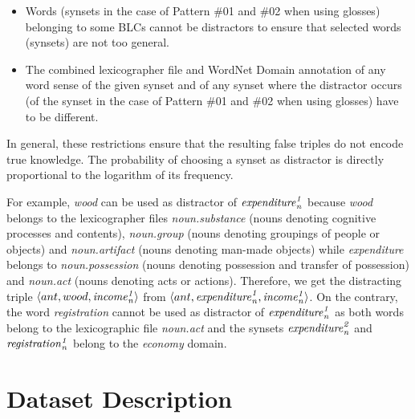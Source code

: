 \documentclass[11pt]{article}
\newcommand{\WORDNET}{WordNet}
\newcommand{\synset}[3]{{\it{#1}_{#3}^{#2}}}
\begin{document}
\begin{itemize}
\item Words (synsets in the case of Pattern \#01 and \#02 when using glosses) belonging to some BLCs cannot be distractors to ensure that selected words (synsets) are not too general.
\item The combined lexicographer file and \WORDNET{} Domain annotation of any word sense of the given synset and of any synset where the distractor occurs (of the synset in the case of Pattern \#01 and \#02 when using glosses) have to be different.
\end{itemize}
In general, these restrictions ensure that the resulting false triples do not encode true knowledge. The probability of choosing a synset as distractor is directly proportional to the logarithm of its frequency.

For example, {\it wood} can be used as distractor of $\synset{expenditure}{1}{n}$ because {\it wood} belongs to the lexicographer files {\it noun.substance} (nouns denoting cognitive processes and contents), {\it noun.group} (nouns denoting groupings of people or objects) and {\it noun.artifact} (nouns denoting man-made objects) while {\it expenditure} belongs to {\it noun.possession} (nouns denoting possession and transfer of possession) and {\it noun.act} (nouns denoting acts or actions). Therefore, we get the distracting triple $\langle ant, wood, \synset{income}{1}{n} \rangle$ from $\langle ant, \synset{expenditure}{1}{n}, \synset{income}{1}{n} \rangle$. On the contrary, the word {\it registration} cannot be used as distractor of $\synset{expenditure}{1}{n}$ as both words belong to the lexicographic file {\it noun.act} and the synsets $\synset{expenditure}{2}{n}$ and $\synset{registration}{1}{n}$ belong to the {\it economy} domain.


\section{Dataset Description} \label{section:DatasetDescription}

\end{document}
